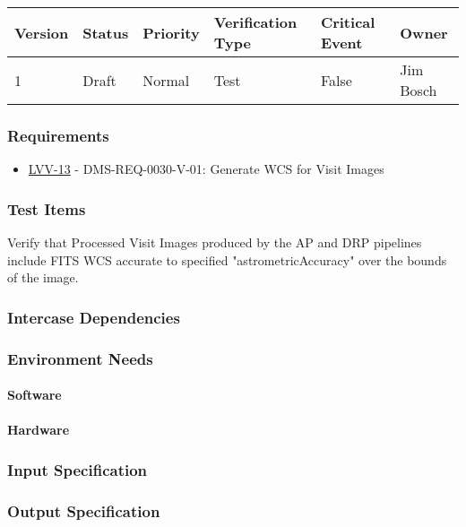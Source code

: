 \begin{longtable}[]{llllll}
\toprule
Version & Status & Priority & Verification Type & Critical Event & Owner
\\\midrule
1 & Draft & Normal &
Test & False & Jim Bosch
\\\bottomrule
\end{longtable}

\subsubsection{Requirements}
\begin{itemize}
\item \href{https://jira.lsstcorp.org/browse/LVV-13}{LVV-13} - DMS-REQ-0030-V-01: Generate WCS for Visit Images
\end{itemize}

\subsubsection{Test Items}
Verify that Processed Visit Images produced by the AP and DRP pipelines
include FITS WCS accurate to specified "astrometricAccuracy" over the
bounds of the image.



\subsubsection{Intercase Dependencies}

\subsubsection{Environment Needs}

\paragraph{Software}

\paragraph{Hardware}

\subsubsection{Input Specification}

\subsubsection{Output Specification}

